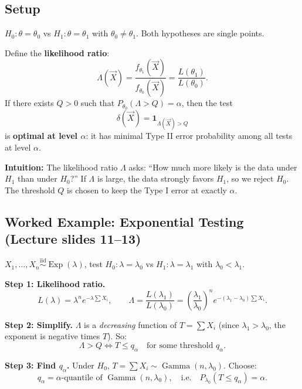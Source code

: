 \documentclass[11pt,a4paper]{article}
\newcommand{\iid}{\overset{\text{iid}}{\sim}}
\begin{document}
\subsection{Setup}

$H_0: \theta = \theta_0$ vs $H_1: \theta = \theta_1$ with $\theta_0\neq\theta_1$. Both hypotheses are single points.

\begin{tcolorbox}[thmbox, title={Neyman-Pearson Lemma (Lecture slide 10)}]
Define the \textbf{likelihood ratio}:
\[
  \Lambda(\vec{X}) = \frac{f_{\theta_1}(\vec{X})}{f_{\theta_0}(\vec{X})} = \frac{L(\theta_1)}{L(\theta_0)}.
\]
If there exists $Q>0$ such that $P_{\theta_0}(\Lambda > Q) = \alpha$, then the test
\[
  \delta(\vec{X}) = \mathbf{1}_{\Lambda(\vec{X})>Q}
\]
is \textbf{optimal at level $\alpha$}: it has minimal Type II error probability among all tests at level $\alpha$.
\end{tcolorbox}

\begin{tcolorbox}[infobox]
\textbf{Intuition:} The likelihood ratio $\Lambda$ asks: ``How much more likely is the data under $H_1$ than under $H_0$?'' If $\Lambda$ is large, the data strongly favors $H_1$, so we reject $H_0$. The threshold $Q$ is chosen to keep the Type I error at exactly $\alpha$.
\end{tcolorbox}

\subsection{Worked Example: Exponential Testing (Lecture slides 11--13)}

$X_1,\ldots,X_n \iid \operatorname{Exp}(\lambda)$, test $H_0:\lambda=\lambda_0$ vs $H_1:\lambda=\lambda_1$ with $\lambda_0 < \lambda_1$.

\textbf{Step 1: Likelihood ratio.}
\[
  L(\lambda) = \lambda^n e^{-\lambda\sum X_i}, \qquad
  \Lambda = \frac{L(\lambda_1)}{L(\lambda_0)} = \left(\frac{\lambda_1}{\lambda_0}\right)^n e^{-(\lambda_1-\lambda_0)\sum X_i}.
\]

\textbf{Step 2: Simplify.} $\Lambda$ is a \emph{decreasing} function of $T=\sum X_i$ (since $\lambda_1>\lambda_0$, the exponent is negative times $T$). So:
\[
  \Lambda > Q \iff T \leq q_\alpha \quad \text{for some threshold } q_\alpha.
\]

\textbf{Step 3: Find $q_\alpha$.} Under $H_0$, $T=\sum X_i \sim \operatorname{Gamma}(n,\lambda_0)$. Choose:
\[
  q_\alpha = \alpha\text{-quantile of }\operatorname{Gamma}(n,\lambda_0), \quad\text{i.e.}\quad P_{\lambda_0}(T\leq q_\alpha)=\alpha.
\]
\end{document}
